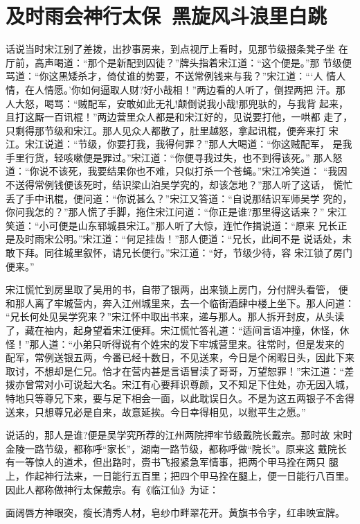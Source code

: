 \chapter{及时雨会神行太保~黑旋风斗浪里白跳}

话说当时宋江别了差拨，出抄事房来，到点视厅上看时，见那节级掇条凳子坐
在厅前，高声喝道：“那个是新配到囚徒？”牌头指着宋江道：“这个便是。”那
节级便骂道：“你这黑矮杀才，倚仗谁的势要，不送常例钱来与我？”宋江道：“‘人
情人情，在人情愿。’你如何逼取人财?好小哉相！”两边看的人听了，倒捏两把
汗。那人大怒，喝骂：“贼配军，安敢如此无礼!颠倒说我小哉!那兜驮的，与我背
起来，且打这厮一百讯棍！”两边营里众人都是和宋江好的，见说要打他，一哄都
走了，只剩得那节级和宋江。那人见众人都散了，肚里越怒，拿起讯棍，便奔来打
宋江。宋江说道：“节级，你要打我，我得何罪？”那人大喝道：“你这贼配军，
是我手里行货，轻咳嗽便是罪过。”宋江道：“你便寻我过失，也不到得该死。”
那人怒道：“你说不该死，我要结果你也不难，只似打杀一个苍蝇。”宋江冷笑道：
“我因不送得常例钱便该死时，结识梁山泊吴学究的，却该怎地？”那人听了这话，
慌忙丢了手中讯棍，便问道：“你说甚么？”宋江又答道：“自说那结识军师吴学
究的，你问我怎的？”那人慌了手脚，拖住宋江问道：“你正是谁?那里得这话来？”
宋江笑道：“小可便是山东郓城县宋江。”那人听了大惊，连忙作揖说道：“原来
兄长正是及时雨宋公明。”宋江道：“何足挂齿！”那人便道：“兄长，此间不是
说话处，未敢下拜。同往城里叙怀，请兄长便行。”宋江道：“好，节级少待，容
宋江锁了房门便来。”

宋江慌忙到房里取了吴用的书，自带了银两，出来锁上房门，分付牌头看管，
便和那人离了牢城营内，奔入江州城里来，去一个临街酒肆中楼上坐下。那人问道：
“兄长何处见吴学究来？”宋江怀中取出书来，递与那人。那人拆开封皮，从头读
了，藏在袖内，起身望着宋江便拜。宋江慌忙答礼道：“适间言语冲撞，休怪，休
怪！”那人道：“小弟只听得说有个姓宋的发下牢城营里来。往常时，但是发来的
配军，常例送银五两，今番已经十数日，不见送来，今日是个闲暇日头，因此下来
取讨，不想却是仁兄。恰才在营内甚是言语冒渎了哥哥，万望恕罪！”宋江道：“差
拨亦曾常对小可说起大名。宋江有心要拜识尊颜，又不知足下住处，亦无因入城，
特地只等尊兄下来，要与足下相会一面，以此耽误日久。不是为这五两银子不舍得
送来，只想尊兄必是自来，故意延挨。今日幸得相见，以慰平生之愿。”

说话的，那人是谁?便是吴学究所荐的江州两院押牢节级戴院长戴宗。那时故
宋时金陵一路节级，都称呼“家长”，湖南一路节级，都称呼做“院长”。原来这
戴院长有一等惊人的道术，但出路时，赍书飞报紧急军情事，把两个甲马拴在两只
腿上，作起神行法来，一日能行五百里；把四个甲马拴在腿上，便一日能行八百里。
因此人都称做神行太保戴宗。有《临江仙》为证：

面阔唇方神眼突，瘦长清秀人材，皂纱巾畔翠花开。黄旗书令字，红串映宣牌。

